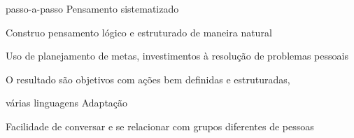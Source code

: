 \begin{cventries}
	\cventry
		{passo-a-passo} %
		{Pensamento sistematizado} %
		{} %
		{} %
		{
			\begin{cvitems} %
				\item {Construo pensamento lógico e estruturado de maneira natural}
				\item {Uso de planejamento de metas, investimentos à resolução de problemas pessoais}
				\item {O resultado são objetivos com ações bem definidas e estruturadas, 
				}
			\end{cvitems}
		}


	\cventry
		{várias linguagens} %
		{Adaptação} %
		{} %
		{} %
		{
			\begin{cvitems} %
				\item {Facilidade de conversar e se relacionar com grupos diferentes de pessoas}
				\item {}
			\end{cvitems}
		}


\end{cventries}
